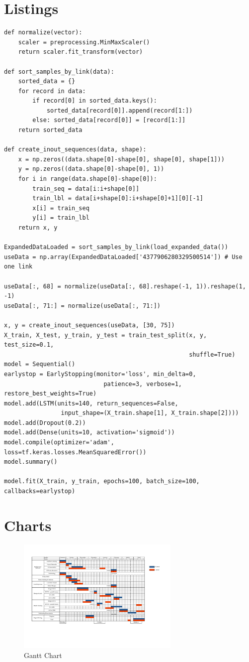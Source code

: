 \chapter{Listings} \label{Appendix:listing}

\begin{lstlisting}[caption=Code of the LSTM model's skeleton]
def normalize(vector):
    scaler = preprocessing.MinMaxScaler()
    return scaler.fit_transform(vector)

def sort_samples_by_link(data):
    sorted_data = {}
    for record in data:
        if record[0] in sorted_data.keys():
            sorted_data[record[0]].append(record[1:])
        else: sorted_data[record[0]] = [record[1:]]
    return sorted_data

def create_inout_sequences(data, shape):
    x = np.zeros((data.shape[0]-shape[0], shape[0], shape[1]))
    y = np.zeros((data.shape[0]-shape[0], 1))
    for i in range(data.shape[0]-shape[0]):
        train_seq = data[i:i+shape[0]]
        train_lbl = data[i+shape[0]:i+shape[0]+1][0][-1]
        x[i] = train_seq
        y[i] = train_lbl
    return x, y

ExpandedDataLoaded = sort_samples_by_link(load_expanded_data())
useData = np.array(ExpandedDataLoaded['4377906280329500514']) # Use one link

useData[:, 68] = normalize(useData[:, 68].reshape(-1, 1)).reshape(1, -1)
useData[:, 71:] = normalize(useData[:, 71:])

x, y = create_inout_sequences(useData, [30, 75])
X_train, X_test, y_train, y_test = train_test_split(x, y, test_size=0.1, 
                                                    shuffle=True)
model = Sequential()
earlystop = EarlyStopping(monitor='loss', min_delta=0, 
                            patience=3, verbose=1, restore_best_weights=True)
model.add(LSTM(units=140, return_sequences=False, 
                input_shape=(X_train.shape[1], X_train.shape[2])))
model.add(Dropout(0.2))
model.add(Dense(units=10, activation='sigmoid'))
model.compile(optimizer='adam', loss=tf.keras.losses.MeanSquaredError())
model.summary()

model.fit(X_train, y_train, epochs=100, batch_size=100, callbacks=earlystop)
\end{lstlisting}

\chapter{Charts} \label{Appendix:chart}

\begin{figure}[!htb]
    \centering
    \includegraphics[width=7.8cm]{Gantt Chart}
    \caption{Gantt Chart}
    \label{Figure:gantt}
\end{figure}